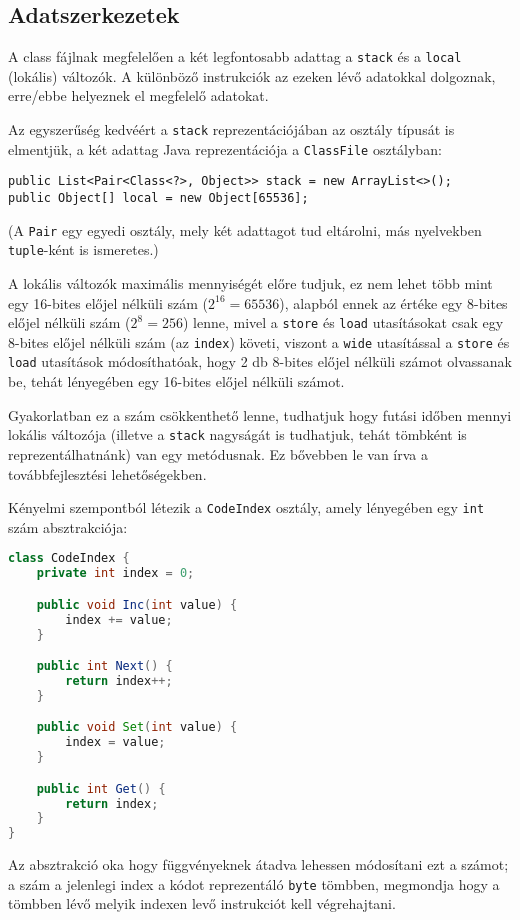 \subsection{Adatszerkezetek}

A class fájlnak megfelelően a két legfontosabb adattag a \lstinline{stack} és a \lstinline{local} (lokális) változók. A különböző instrukciók az ezeken lévő adatokkal dolgoznak, erre/ebbe helyeznek el megfelelő adatokat.

Az egyszerűség kedvéért a \lstinline{stack} reprezentációjában az osztály típusát is elmentjük, a két adattag Java reprezentációja a \lstinline{ClassFile} osztályban:
\begin{verbatim}
public List<Pair<Class<?>, Object>> stack = new ArrayList<>();
public Object[] local = new Object[65536];
\end{verbatim}
(A \lstinline{Pair} egy egyedi osztály, mely két adattagot tud eltárolni, más nyelvekben \lstinline{tuple}-ként is ismeretes.)

A lokális változók maximális mennyiségét előre tudjuk, ez nem lehet több mint egy 16-bites előjel nélküli szám ($2^{16} = 65536$), alapból ennek az értéke egy 8-bites előjel nélküli szám ($2^8 = 256$) lenne, mivel a \lstinline{store} és \lstinline{load} utasításokat csak egy 8-bites előjel nélküli szám (az \lstinline{index}) követi, viszont a \lstinline{wide} utasítással a \lstinline{store} és \lstinline{load} utasítások módosíthatóak, hogy 2 db 8-bites előjel nélküli számot olvassanak be, tehát lényegében egy 16-bites előjel nélküli számot.

Gyakorlatban ez a szám csökkenthető lenne, tudhatjuk hogy futási időben mennyi lokális változója (illetve a \lstinline{stack} nagyságát is tudhatjuk, tehát tömbként is reprezentálhatnánk) van egy metódusnak. Ez bővebben le van írva a továbbfejlesztési lehetőségekben.

Kényelmi szempontból létezik a \lstinline{CodeIndex} osztály, amely lényegében egy \lstinline{int} szám absztrakciója:
\begin{lstlisting}[language={Java}]
class CodeIndex {
    private int index = 0;

    public void Inc(int value) {
        index += value;
    }

    public int Next() {
        return index++;
    }

    public void Set(int value) {
        index = value;
    }

    public int Get() {
        return index;
    }
}
\end{lstlisting}
Az absztrakció oka hogy függvényeknek átadva lehessen módosítani ezt a számot; a szám a jelenlegi index a kódot reprezentáló \lstinline{byte} tömbben, megmondja hogy a tömbben lévő melyik indexen levő instrukciót kell végrehajtani.

